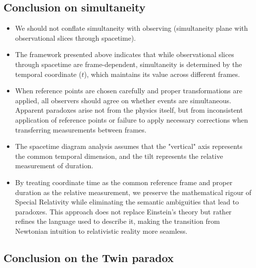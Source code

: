 \documentclass[a4paper,fleqn]{cas-sc}
\begin{document}
	\subsection{Conclusion on simultaneity}\label{subsec6_1}
		\begin{itemize}
			\item We should not conflate simultaneity with observing (simultaneity plane with observational slices through spacetime). 
			\item The framework presented above indicates that while observational slices through spacetime are frame-dependent, simultaneity is determined by the temporal coordinate ($t$), which maintains its value across different frames.	
			\item When reference points are chosen carefully and proper transformations are applied, all observers should agree on whether events are simultaneous. Apparent paradoxes arise not from the physics itself, but from inconsistent application of reference points or failure to apply necessary corrections when transferring measurements between frames.
			\item The spacetime diagram analysis assumes that the "vertical" axis represents the common temporal dimension, and the tilt represents the relative measurement of duration.
			\item By treating coordinate time as the common reference frame and proper duration as the relative measurement, we preserve the mathematical rigour of Special Relativity while eliminating the semantic ambiguities that lead to paradoxes. This approach does not replace Einstein's theory but rather refines the language used to describe it, making the transition from Newtonian intuition to relativistic reality more seamless.
		\end{itemize}
	\subsection{Conclusion on the Twin paradox}\label{subsec6_2}
\end{document}
